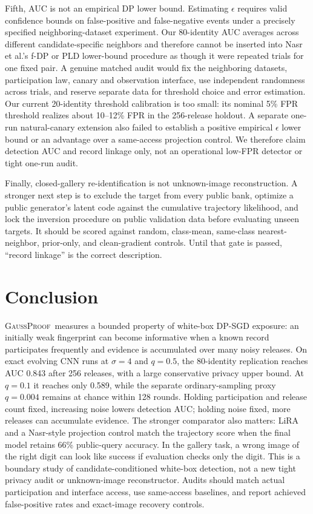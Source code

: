 \documentclass[conference]{IEEEtran}
\newcommand{\method}{\textsc{GaussProof}}
\begin{document}
Fifth, AUC is not an empirical DP lower bound. Estimating $\epsilon$ requires valid confidence bounds on false-positive and false-negative events under a precisely specified neighboring-dataset experiment. Our 80-identity AUC averages across different candidate-specific neighbors and therefore cannot be inserted into Nasr et al.'s f-DP or PLD lower-bound procedure as though it were repeated trials for one fixed pair. A genuine matched audit would fix the neighboring datasets, participation law, canary and observation interface, use independent randomness across trials, and reserve separate data for threshold choice and error estimation. Our current 20-identity threshold calibration is too small: its nominal 5\% FPR threshold realizes about 10--12\% FPR in the 256-release holdout. A separate one-run natural-canary extension also failed to establish a positive empirical $\epsilon$ lower bound or an advantage over a same-access projection control. We therefore claim detection AUC and record linkage only, not an operational low-FPR detector or tight one-run audit.

Finally, closed-gallery re-identification is not unknown-image reconstruction. A stronger next step is to exclude the target from every public bank, optimize a public generator's latent code against the cumulative trajectory likelihood, and lock the inversion procedure on public validation data before evaluating unseen targets. It should be scored against random, class-mean, same-class nearest-neighbor, prior-only, and clean-gradient controls. Until that gate is passed, ``record linkage'' is the correct description.

\section{Conclusion}

\method~measures a bounded property of white-box DP-SGD exposure: an initially weak fingerprint can become informative when a known record participates frequently and evidence is accumulated over many noisy releases. On exact evolving CNN runs at $\sigma=4$ and $q=0.5$, the 80-identity replication reaches AUC 0.843 after 256 releases, with a large conservative privacy upper bound. At $q=0.1$ it reaches only 0.589, while the separate ordinary-sampling proxy $q=0.004$ remains at chance within 128 rounds. Holding participation and release count fixed, increasing noise lowers detection AUC; holding noise fixed, more releases can accumulate evidence. The stronger comparator also matters: LiRA and a Nasr-style projection control match the trajectory score when the final model retains 66\% public-query accuracy. In the gallery task, a wrong image of the right digit can look like success if evaluation checks only the digit. This is a boundary study of candidate-conditioned white-box detection, not a new tight privacy audit or unknown-image reconstructor. Audits should match actual participation and interface access, use same-access baselines, and report achieved false-positive rates and exact-image recovery controls.
\end{document}
